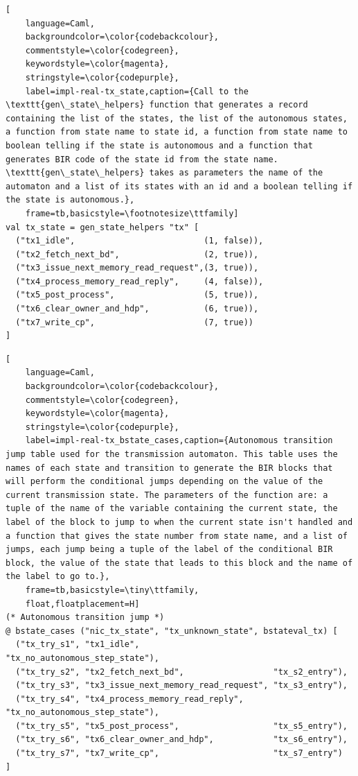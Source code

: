 \documentclass{kththesis}
\begin{document}
\begin{lstlisting}[
    language=Caml,
    backgroundcolor=\color{codebackcolour},
    commentstyle=\color{codegreen},
    keywordstyle=\color{magenta},
    stringstyle=\color{codepurple},
    label=impl-real-tx_state,caption={Call to the \texttt{gen\_state\_helpers} function that generates a record containing the list of the states, the list of the autonomous states, a function from state name to state id, a function from state name to boolean telling if the state is autonomous and a function that generates BIR code of the state id from the state name. \texttt{gen\_state\_helpers} takes as parameters the name of the automaton and a list of its states with an id and a boolean telling if the state is autonomous.},
    frame=tb,basicstyle=\footnotesize\ttfamily]
val tx_state = gen_state_helpers "tx" [
  ("tx1_idle",                          (1, false)),
  ("tx2_fetch_next_bd",                 (2, true)),
  ("tx3_issue_next_memory_read_request",(3, true)),
  ("tx4_process_memory_read_reply",     (4, false)),
  ("tx5_post_process",                  (5, true)),
  ("tx6_clear_owner_and_hdp",           (6, true)),
  ("tx7_write_cp",                      (7, true))
]
\end{lstlisting}

\begin{lstlisting}[
    language=Caml,
    backgroundcolor=\color{codebackcolour},
    commentstyle=\color{codegreen},
    keywordstyle=\color{magenta},
    stringstyle=\color{codepurple},
    label=impl-real-tx_bstate_cases,caption={Autonomous transition jump table used for the transmission automaton. This table uses the names of each state and transition to generate the BIR blocks that will perform the conditional jumps depending on the value of the current transmission state. The parameters of the function are: a tuple of the name of the variable containing the current state, the label of the block to jump to when the current state isn't handled and a function that gives the state number from state name, and a list of jumps, each jump being a tuple of the label of the conditional BIR block, the value of the state that leads to this block and the name of the label to go to.},
    frame=tb,basicstyle=\tiny\ttfamily,
    float,floatplacement=H]
(* Autonomous transition jump *)
@ bstate_cases ("nic_tx_state", "tx_unknown_state", bstateval_tx) [
  ("tx_try_s1", "tx1_idle",                           "tx_no_autonomous_step_state"),
  ("tx_try_s2", "tx2_fetch_next_bd",                  "tx_s2_entry"),
  ("tx_try_s3", "tx3_issue_next_memory_read_request", "tx_s3_entry"),
  ("tx_try_s4", "tx4_process_memory_read_reply",      "tx_no_autonomous_step_state"),
  ("tx_try_s5", "tx5_post_process",                   "tx_s5_entry"),
  ("tx_try_s6", "tx6_clear_owner_and_hdp",            "tx_s6_entry"),
  ("tx_try_s7", "tx7_write_cp",                       "tx_s7_entry")
]
\end{lstlisting}
\end{document}
